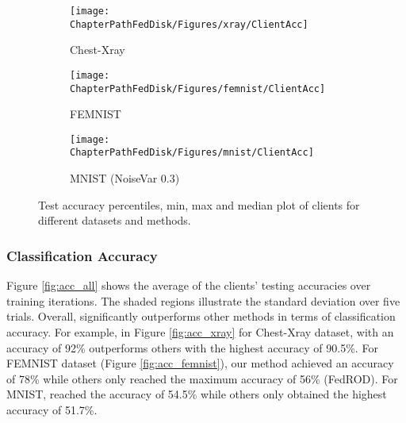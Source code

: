\begin{figure*}[ht!]
	\centering
	\begin{subfigure}[t]{0.3\linewidth}	
		\texttt{[image: \\ChapterPathFedDisk/Figures/xray/ClientAcc]}
		\caption{Chest-Xray }
		\label{fig:cl_acc_xray}
	\end{subfigure}
	\hspace{0.01em}%
	\begin{subfigure}[t]{0.3\linewidth}
		\texttt{[image: \\ChapterPathFedDisk/Figures/femnist/ClientAcc]}
		\caption{FEMNIST}
		\label{fig:cl_acc_femnist}
	\end{subfigure}
	\hspace{0.01em}%
	\begin{subfigure}[t]{0.3\linewidth}	
		\texttt{[image: \\ChapterPathFedDisk/Figures/mnist/ClientAcc]}
		\caption{MNIST (NoiseVar 0.3) }
		\label{fig:cl_acc_mnist}
	\end{subfigure}
	\caption[Classification results over 100 clients.]{Test accuracy percentiles, min, max and median plot of \parties{} clients for different datasets and methods. }
	\label{fig:cl_acc_all}
\end{figure*}

\subsubsection{Classification Accuracy} Figure \ref{fig:acc_all} shows the average of the \parties{} clients' testing accuracies over training iterations. The shaded regions illustrate the standard deviation over five trials. Overall, \MethodnameShort{} significantly outperforms other methods in terms of classification accuracy. For example, in Figure \ref{fig:acc_xray} for Chest-Xray dataset, \MethodnameShort{} with an accuracy of 92\% outperforms others with the highest accuracy of 90.5\%. For FEMNIST dataset (Figure \ref{fig:acc_femnist}), our method achieved an accuracy of 78\% while others only reached the maximum accuracy of 56\% (FedROD). For MNIST, \MethodnameShort{} reached the accuracy of 54.5\% while others only obtained the highest accuracy of 51.7\%. 

